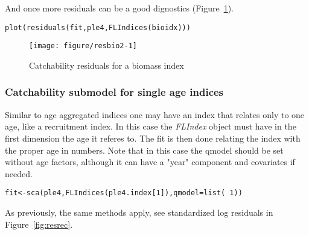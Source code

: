 \documentclass[a4paper,english,10pt]{article}\usepackage[]{graphicx}\usepackage[]{color}
\makeatletter
\def\maxwidth{ %
  \ifdim\Gin@nat@width>\linewidth
    \linewidth
  \else
    \Gin@nat@width
  \fi
}
\newcommand{\hlnum}[1]{\textcolor[rgb]{0.2,0.2,0.2}{#1}}%
\newcommand{\hlopt}[1]{\textcolor[rgb]{0.2,0.2,0.2}{#1}}%
\newcommand{\hlstd}[1]{\textcolor[rgb]{0,0,0}{#1}}%
\newcommand{\hlkwb}[1]{\textcolor[rgb]{0.361,0.506,0.596}{#1}}%
\newcommand{\hlkwc}[1]{\textcolor[rgb]{0.361,0.506,0.596}{#1}}%
\newcommand{\hlkwd}[1]{\textcolor[rgb]{0.361,0.506,0.596}{#1}}%
\newenvironment{kframe}{%
 \def\at@end@of@kframe{}%
 \ifinner\ifhmode%
  \def\at@end@of@kframe{\end{minipage}}%
  \begin{minipage}{\columnwidth}%
 \fi\fi%
 \def\FrameCommand##1{\hskip\@totalleftmargin \hskip-\fboxsep
 \colorbox{shadecolor}{##1}\hskip-\fboxsep
     \hskip-\linewidth \hskip-\@totalleftmargin \hskip\columnwidth}%
 \MakeFramed {\advance\hsize-\width
   \@totalleftmargin\z@ \linewidth\hsize
   \@setminipage}}%
 {\par\unskip\endMakeFramed%
 \at@end@of@kframe}
\newenvironment{knitrout}{}{} %
\newcommand{\class}[1]{{\textit{#1}}}
\makeatother
\begin{document}
And once more residuals can be a good dignostics (Figure~\ref{fig:resbio2}).

\begin{knitrout}
\color{fgcolor}\begin{kframe}
\begin{alltt}
\hlkwd{plot}\hlstd{(}\hlkwd{residuals}\hlstd{(fit, ple4,} \hlkwd{FLIndices}\hlstd{(bioidx)))}
\end{alltt}
\end{kframe}\begin{figure}[H]

{\centering \texttt{[image: figure/resbio2-1]} 

}

\caption[Catchability residuals for a biomass index]{Catchability residuals for a biomass index\label{fig:resbio2}}
\end{figure}


\end{knitrout}

\subsubsection{Catchability submodel for single age indices}

Similar to age aggregated indices one may have an index that relates only to one age, like a recruitment index. In this case the \class{FLIndex} object must have in the first dimension the age it referes to. The fit is then done relating the index with the proper age in numbers. Note that in this case the qmodel should be set without age factors, although it can have a "year" component and covariates if needed.

\begin{knitrout}
\color{fgcolor}\begin{kframe}
\begin{alltt}
\hlstd{fit} \hlkwb{<-} \hlkwd{sca}\hlstd{(ple4,} \hlkwd{FLIndices}\hlstd{(ple4.index[}\hlnum{1}\hlstd{]),} \hlkwc{qmodel}\hlstd{=}\hlkwd{list}\hlstd{(}\hlopt{~}\hlnum{1}\hlstd{))}
\end{alltt}
\end{kframe}
\end{knitrout}

As previously, the same methods apply, see standardized log residuals in Figure~\ref{fig:resrec}.
\end{document}
